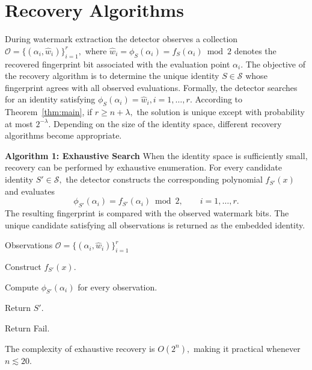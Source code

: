\documentclass[a4paper,11pt]{llncs}
\begin{document}
\section{Recovery Algorithms}
\label{sec:recovery}
During watermark extraction the detector observes a collection
$\mathcal O=
\{(\alpha_i,\hat w_i)\}_{i=1}^{r},$
where
$\hat w_i=\phi_S(\alpha_i)
=f_S(\alpha_i)\bmod2$
denotes the recovered fingerprint bit associated with the evaluation
point $\alpha_i$.
The objective of the recovery algorithm is to determine the unique
identity
$S\in\mathcal S$
whose fingerprint agrees with all observed evaluations. Formally, the
detector searches for an identity satisfying
$\phi_S(\alpha_i)=\hat w_i,
i=1,\ldots,r.$
According to Theorem~\ref{thm:main}, if
$r\ge n+\lambda,$
the solution is unique except with probability at most
$2^{-\lambda}$.
Depending on the size of the identity space, different recovery
algorithms become appropriate.
\vspace{3mm}

\noindent
{\bf Algorithm 1: Exhaustive Search}
%
When the identity space is sufficiently small, recovery can be
performed by exhaustive enumeration.
For every candidate identity
$S'
\in
\mathcal S,$
the detector constructs the corresponding polynomial
$f_{S'}(x)$ and evaluates
\[
\phi_{S'}(\alpha_i)
=
f_{S'}(\alpha_i)\bmod2,
\qquad
i=1,\ldots,r.
\]
The resulting fingerprint is compared with the observed watermark bits.
The unique candidate satisfying all observations is returned as the
embedded identity.
%
\begin{algorithm}[H]
\caption{Exhaustive Recovery}
\label{alg:lookup}
\begin{algorithmic}[1]
\Require Observations
$\mathcal O=\{(\alpha_i,\hat w_i)\}_{i=1}^{r}$


    \State Construct $f_{S'}(x)$.

    \State Compute
    $\phi_{S'}(\alpha_i)$
    for every observation.


        \State Return $S'$.

    \EndIf

\EndFor

\State Return {\sc Fail}.

\end{algorithmic}
\end{algorithm}
%
\noindent
The complexity of exhaustive recovery is $O(2^n),$
making it practical whenever $n\lesssim20.$
\vspace{3mm}
\end{document}
